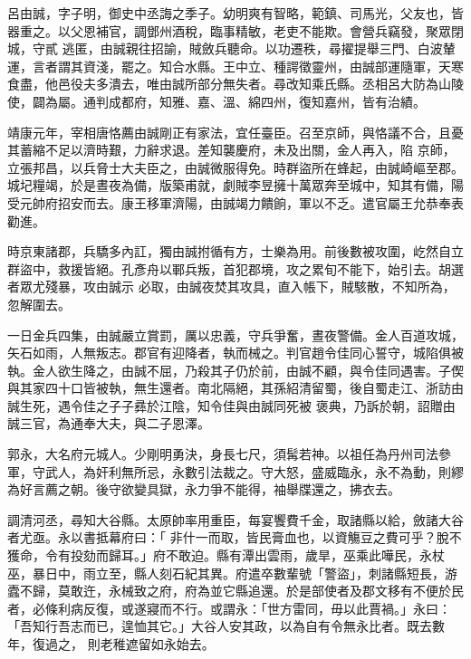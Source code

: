 \begin{pinyinscope}
 呂由誠，字子明，御史中丞誨之季子。幼明爽有智略，範鎮、司馬光，父友也，皆器重之。以父恩補官，調鄧州酒稅，臨事精敏，老吏不能欺。會營兵竊發，聚眾閉城，守貳
 逃匿，由誠親往招諭，賊斂兵聽命。以功遷秩，尋擢提舉三門、白波輦運，言者謂其資淺，罷之。知合水縣。王中立、種諤徵靈州，由誠部運隨軍，天寒食盡，他邑役夫多潰去，唯由誠所部分無失者。尋改知乘氏縣。丞相呂大防為山陵使，闢為屬。通判成都府，知雅、嘉、溫、綿四州，復知嘉州，皆有治績。



 靖康元年，宰相唐恪薦由誠剛正有家法，宜任臺臣。召至京師，與恪議不合，且憂其蓄縮不足以濟時艱，力辭求退。差知襲慶府，未及出關，金人再入，陷
 京師，立張邦昌，以兵脅士大夫臣之，由誠微服得免。時群盜所在蜂起，由誠崎嶇至郡。城圮糧竭，於是晝夜為備，版築甫就，劇賊李昱擁十萬眾奔至城中，知其有備，陽受元帥府招安而去。康王移軍濟陽，由誠竭力饋餉，軍以不乏。遣官屬王允恭奉表勸進。



 時京東諸郡，兵驕多內訌，獨由誠拊循有方，士樂為用。前後數被攻圍，屹然自立群盜中，救援皆絕。孔彥舟以鄆兵叛，首犯郡境，攻之累旬不能下，始引去。胡選者眾尤殘暴，攻由誠示
 必取，由誠夜焚其攻具，直入帳下，賊駭散，不知所為，忽解圍去。



 一日金兵四集，由誠嚴立賞罰，厲以忠義，守兵爭奮，晝夜警備。金人百道攻城，矢石如雨，人無叛志。郡官有迎降者，執而械之。判官趙令佳同心誓守，城陷俱被執。金人欲生降之，由誠不屈，乃殺其子仍於前，由誠不顧，與令佳同遇害。子偰與其家四十口皆被執，無生還者。南北隔絕，其孫紹清留蜀，後自蜀走江、浙訪由誠生死，遇令佳之子子彞於江陰，知令佳與由誠同死被
 褒典，乃訴於朝，詔贈由誠三官，為通奉大夫，與二子恩澤。



 郭永，大名府元城人。少剛明勇決，身長七尺，須髯若神。以祖任為丹州司法參軍，守武人，為奸利無所忌，永數引法裁之。守大怒，盛威臨永，永不為動，則繆為好言薦之朝。後守欲變具獄，永力爭不能得，袖舉牒還之，拂衣去。



 調清河丞，尋知大谷縣。太原帥率用重臣，每宴饗費千金，取諸縣以給，斂諸大谷者尤亟。永以書抵幕府曰：「
 非什一而取，皆民膏血也，以資觴豆之費可乎？脫不獲命，令有投劾而歸耳。」府不敢迫。縣有潭出雲雨，歲旱，巫乘此嘩民，永杖巫，暴日中，雨立至，縣人刻石紀其異。府遣卒數輩號「警盜」，刺諸縣短長，游蠹不歸，莫敢迕，永械致之府，府為並它縣追還。於是部使者及郡文移有不便於民者，必條利病反復，或遂寢而不行。或謂永：「世方雷同，毋以此賈禍。」永曰：「吾知行吾志而已，遑恤其它。」大谷人安其政，以為自有令無永比者。既去數年，復過之，
 則老稚遮留如永始去。




\end{pinyinscope}
